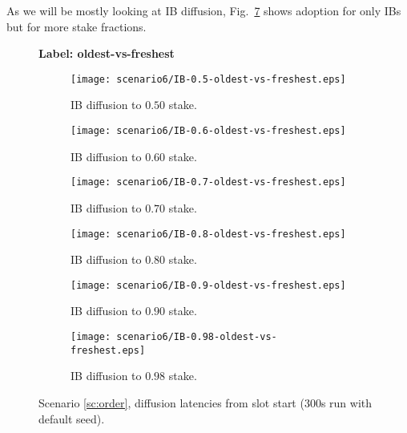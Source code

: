 \documentclass[11pt,a4paper]{article}
\newcommand{\debug}[1]{#1}
\begin{document}
As we will be mostly looking at IB diffusion, Fig.~\ref{fig:oldest-vs-freshest} shows adoption for only IBs but for more stake fractions.
\begin{figure}[htbp]
    \centering
    \debug{\textbf{Label: oldest-vs-freshest} \\}
    \begin{subfigure}[b]{0.45\textwidth}
        \centering
        \texttt{[image: scenario6/IB-0.5-oldest-vs-freshest.eps]}
        \caption{IB diffusion to $0.50$ stake.}
        \label{fig:oldest-vs-freshest:ib0.5}
    \end{subfigure}
    \hfill
    \begin{subfigure}[b]{0.45\textwidth}
        \centering
        \texttt{[image: scenario6/IB-0.6-oldest-vs-freshest.eps]}
        \caption{IB diffusion to $0.60$ stake.}
        \label{fig:oldest-vs-freshest:ib0.6}
    \end{subfigure}

    \vspace{1em}

    \begin{subfigure}[b]{0.45\textwidth}
        \centering
        \texttt{[image: scenario6/IB-0.7-oldest-vs-freshest.eps]}
        \caption{IB diffusion to $0.70$ stake.}
        \label{fig:oldest-vs-freshest:ib0.7}
    \end{subfigure}
    \hfill
    \begin{subfigure}[b]{0.45\textwidth}
        \centering
        \texttt{[image: scenario6/IB-0.8-oldest-vs-freshest.eps]}
        \caption{IB diffusion to $0.80$ stake.}
        \label{fig:oldest-vs-freshest:ib0.8}
    \end{subfigure}

    \vspace{1em}

    \begin{subfigure}[b]{0.45\textwidth}
        \centering
        \texttt{[image: scenario6/IB-0.9-oldest-vs-freshest.eps]}
        \caption{IB diffusion to $0.90$ stake.}
        \label{fig:oldest-vs-freshest:ib0.9}
    \end{subfigure}
    \hfill
    \begin{subfigure}[b]{0.45\textwidth}
        \centering
        \texttt{[image: scenario6/IB-0.98-oldest-vs-freshest.eps]}
        \caption{IB diffusion to $0.98$ stake.}
        \label{fig:oldest-vs-freshest:ib0.98}
    \end{subfigure}

    \caption{Scenario \ref{sc:order}, diffusion latencies from slot start (300s run with default seed).}
    \label{fig:oldest-vs-freshest}
\end{figure}
\end{document}
